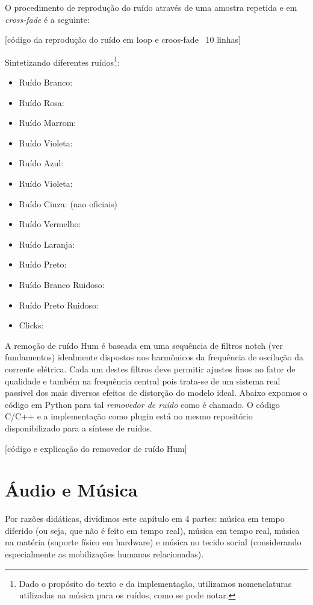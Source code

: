 O procedimento de reprodução do ruído através de uma amostra repetida
e em \textit{cross-fade} é a seguinte:

[código da reprodução do ruído em loop e croos-fade ~10 linhas]

Sintetizando diferentes ruídos\footnote{Dado o propósito do texto e da
  implementação, utilizamos nomenclaturas utilizadas na música para os
  ruídos, como se pode notar.}:

\begin{itemize}
    \item Ruído Branco: 
    \item Ruído Rosa:
    \item Ruído Marrom:
    \item Ruído Violeta:
    \item Ruído Azul:
    \item Ruído Violeta:
    \item Ruído Cinza:
    (nao oficiais)
    \item Ruído Vermelho:
    \item Ruído Laranja:
    \item Ruído Preto:
    \item Ruído Branco Ruidoso:
    \item Ruído Preto Ruidoso:
    \item Clicks:
\end{itemize} 

A remoção de ruído Hum é baseada em uma sequência de filtros notch
(ver fundamentos) idealmente dispostos nos harmônicos da frequência de
oscilação da corrente elétrica. Cada um destes filtros deve permitir
ajustes finos no fator de qualidade e também na frequência central
pois trata-se de um sistema real passível dos mais diversos efeitos de
distorção do modelo ideal. Abaixo expomos o código em Python para tal
\emph{removedor de ruído} como é chamado. O código C/C++ e a
implementação como plugin está no mesmo repositório disponibilizado
para a síntese de ruídos.

[código e explicação do removedor de ruído Hum]

\section{Áudio e Música}

Por razões didáticas, dividimos este capítulo em 4 partes: música em
tempo diferido (ou seja, que não é feito em tempo real), música em
tempo real, música na matéria (suporte físico em hardware) e música no
tecido social (considerando especialmente as mobilizações humanas
relacionadas).

